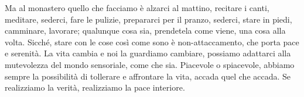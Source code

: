 Ma al monastero quello che facciamo è alzarci al mattino, recitare i
canti, meditare, sederci, fare le pulizie, prepararci per il pranzo,
sederci, stare in piedi, camminare, lavorare; qualunque cosa sia,
prendetela come viene, una cosa alla volta. Sicché, stare con le cose
così come sono è non-attaccamento, che porta pace e serenità. La vita
cambia e noi la guardiamo cambiare, possiamo adattarci alla mutevolezza
del mondo sensoriale, come che sia. Piacevole o spiacevole, abbiamo
sempre la possibilità di tollerare e affrontare la vita, accada quel che
accada. Se realizziamo la verità, realizziamo la pace interiore.
